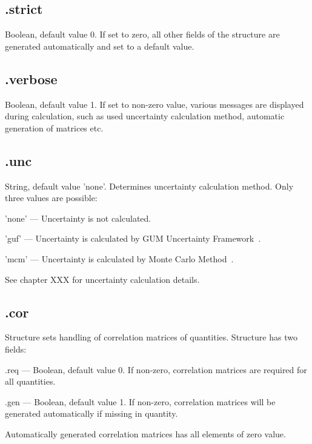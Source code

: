 \documentclass[12pt,a4paper,oneside]{report} %
\begin{document}
\subsection{\textsf{.strict}} %
\label{structcalcsetstrict}
Boolean, default value 0. If set to zero, all other fields of the structure are generated
automatically and set to a default value.

\subsection{\textsf{.verbose}} %
\label{structcalcsetverbose}
Boolean, default value 1. If set to non-zero value, various messages are displayed during
calculation, such as used uncertainty calculation method, automatic generation of matrices etc.

\subsection{\textsf{.unc}} %
\label{structcalcsetunc}
String, default value 'none'. Determines uncertainty calculation method. Only three values are possible:
\begin{tightdesc}
        \item [\textsf{'none'}] ---  Uncertainty is not calculated.
        \item [\textsf{'guf'}] ---  Uncertainty is calculated by GUM Uncertainty Framework~\cite{JCGM1995}.
        \item [\textsf{'mcm'}] ---  Uncertainty is calculated by Monte Carlo Method~\cite{JCGM2008}.
\end{tightdesc}
See chapter XXX %
for uncertainty calculation details.

\subsection{\textsf{.cor}} %
\label{structcalcsetcor}
Structure sets handling of correlation matrices of quantities. Structure has two fields:
\begin{tightdesc}
        \item [\textsf{.req}] ---  Boolean, default value 0. If non-zero, correlation matrices are required for all quantities.
        \item [\textsf{.gen}] ---  Boolean, default value 1. If non-zero, correlation matrices will be generated
        automatically if missing in quantity.
\end{tightdesc}
Automatically generated correlation matrices has all elements of zero value.
\end{document}
